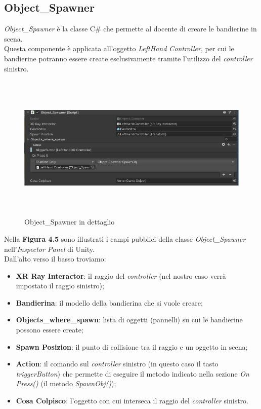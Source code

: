 \subsection{Object\_Spawner}
\textit{Object\_Spawner} è la classe C\# che permette al docente di creare le bandierine in scena.\\Questa componente è applicata all'oggetto \textit{LeftHand Controller}, per cui le bandierine potranno essere create esclusivamente tramite l'utilizzo del \textit{controller} sinistro.
\begin{figure}[H]
    \centering
    \includegraphics[width = 16cm, height = 7cm]{Immagini/Object_spawner.jpg}
    \caption{Object\_Spawner in dettaglio}
    \label{fig:my_label}
\end{figure}
\hspace{-0.6cm}Nella \textbf{Figura 4.5} sono illustrati i campi pubblici della classe \textit{Object\_Spawner} nell'\textit{Inspector Panel} di Unity.
\\Dall'alto verso il basso troviamo:
\begin{itemize}
    \item \textbf{XR Ray Interactor}: il raggio del \textit{controller} (nel nostro caso verrà impostato il raggio sinistro);
    \item \textbf{Bandierina}: il modello della bandierina che si vuole creare;
    \item \textbf{Objects\_where\_spawn}: lista di oggetti (pannelli) su cui le bandierine possono essere create;
    \item \textbf{Spawn Posizion}: il punto di collisione tra il raggio e un oggetto in scena;
    \item \textbf{Action}: il comando sul \textit{controller} sinistro (in questo caso il tasto \textit{triggerButton}) che permette di eseguire il metodo indicato nella sezione \textit{On Press()} (il metodo \textit{SpawnObj()});
    \item \textbf{Cosa Colpisco}: l'oggetto con cui interseca il raggio del \textit{controller} sinistro.
\end{itemize}
